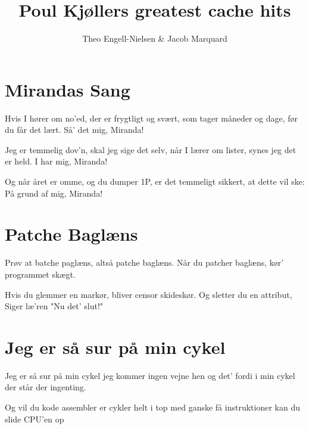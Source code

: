 \documentclass[10pt]{article}
\title{Poul Kjøllers greatest cache hits}
\author{Theo Engell-Nielsen \& Jacob Marquard}
\begin{document}
\label{revy:poul}

\section*{Mirandas Sang}%
\begin{song}
Hvis I hører om no'ed,
der er frygtligt og svært, 
som tager måneder og dage,
før du får det lært.
Så' det mig, Miranda!

Jeg er temmelig dov'n,
skal jeg sige det selv, 
når I lærer om lister,
synes jeg det er held.
I har mig, Miranda!

Og når året er omme,
og du dumper 1P,
er det temmeligt sikkert,
at dette vil ske:
På grund af mig, Miranda!
\end{song}

\section*{Patche Baglæns}%
\begin{song}
Prøv at batche paglæns,
altså patche baglæns. 
Når du patcher baglæns, 
kør' programmet skægt.

Hvis du glemmer en markør,
bliver censor skideskør.
Og sletter du en attribut,
Siger læ'ren "Nu det' slut!"
\end{song}

\pagebreak

\section*{Jeg er så sur på min cykel}%
\begin{song}
Jeg er så sur på min cykel
jeg kommer ingen vejne hen
og det' fordi i min cykel
der står der ingenting.

Og vil du kode assembler
er cykler helt i top
med ganske få instruktioner
kan du slide CPU'en op


\end{song}
\end{document}
